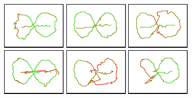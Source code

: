 \documentclass[letterpaper, 10pt, conference]{ieeeconf}
\begin{document}
\begin{figure}
\includegraphics[width=.15\textwidth]{breugel_babel-traj} \hfill
\includegraphics[width=.15\textwidth]{van-gogh_starry-night-traj} \hfill
\includegraphics[width=.15\textwidth]{kandinsky_comp-8-traj} \hfill
\includegraphics[width=.15\textwidth]{vermeer_girl-pearl-traj} \hfill
\includegraphics[width=.15\textwidth]{babar-traj} \hfill
\includegraphics[width=.15\textwidth]{child-drawing_tooth-fairy-traj}

\vspace{.7em}


\end{figure}
\end{document}
